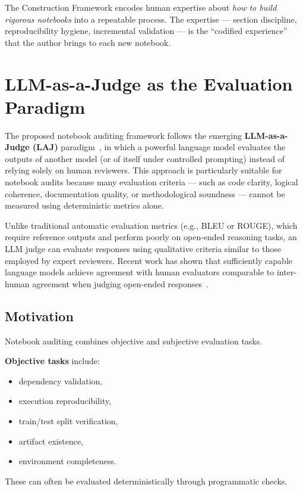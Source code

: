 \documentclass[11pt, a4paper]{article}
\begin{document}
The Construction Framework encodes human expertise about \textit{how to build
rigorous notebooks} into a repeatable process. The expertise — section
discipline, reproducibility hygiene, incremental validation — is the
``codified experience'' that the author brings to each new notebook.

\section{LLM-as-a-Judge as the Evaluation Paradigm}
\label{sec:laj}

The proposed notebook auditing framework follows the emerging
\textbf{LLM-as-a-Judge (LAJ)} paradigm~\cite{zheng2023judging}, in which a
powerful language model evaluates the outputs of another model (or of itself
under controlled prompting) instead of relying solely on human reviewers.
This approach is particularly suitable for notebook audits because many
evaluation criteria --- such as code clarity, logical coherence,
documentation quality, or methodological soundness --- cannot be measured
using deterministic metrics alone.

Unlike traditional automatic evaluation metrics (e.g., BLEU or ROUGE), which
require reference outputs and perform poorly on open-ended reasoning tasks,
an LLM judge can evaluate responses using qualitative criteria similar to
those employed by expert reviewers. Recent work has shown that sufficiently
capable language models achieve agreement with human evaluators comparable to
inter-human agreement when judging open-ended responses~\cite{zheng2023judging}.

\subsection{Motivation}

Notebook auditing combines objective and subjective evaluation tasks.

\textbf{Objective tasks} include:
\begin{itemize}
  \item dependency validation,
  \item execution reproducibility,
  \item train/test split verification,
  \item artifact existence,
  \item environment completeness.
\end{itemize}
These can often be evaluated deterministically through programmatic checks.
\end{document}
